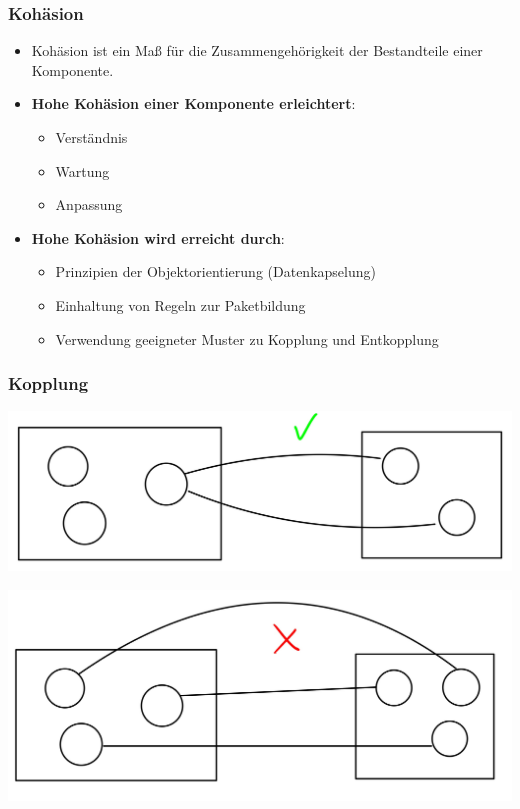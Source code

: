 \documentclass[11pt, a4paper]{article}
\begin{document}
\subsubsection{Kohäsion}
\begin{itemize}
    \item Kohäsion ist ein Maß für die Zusammengehörigkeit der Bestandteile einer Komponente.
    \item \textbf{Hohe Kohäsion einer Komponente erleichtert}:
    \begin{itemize}
        \item Verständnis
        \item Wartung
        \item Anpassung
    \end{itemize}
    \item \textbf{Hohe Kohäsion wird erreicht durch}:
    \begin{itemize}
        \item Prinzipien der Objektorientierung (Datenkapselung)
        \item Einhaltung von Regeln zur Paketbildung
        \item Verwendung geeigneter Muster zu Kopplung und Entkopplung
    \end{itemize}
\end{itemize}

\newpage

\subsubsection{Kopplung}



\begin{minipage}[h]{0.45\textwidth}
    \centering \includegraphics[width=1\textwidth]{Kopplung-00.JPG}
\end{minipage}
\begin{minipage}[h]{0.45\textwidth}
    \centering \includegraphics[width=1\textwidth]{Kopplung-01.JPG}
\end{minipage}
\end{document}
